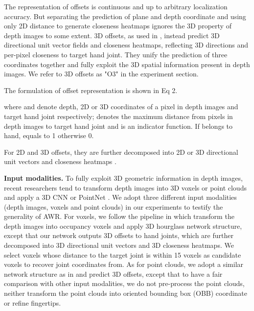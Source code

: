 \documentclass[letterpaper]{article} \usepackage{aaai20}  \usepackage{times}  \usepackage{helvet} \usepackage{courier}  \usepackage[hyphens]{url}  \usepackage{graphicx} \usepackage{amsmath}
\begin{document}
The representation of offsets is continuous and up to arbitrary localization accuracy. But separating the prediction of plane and depth coordinate and using only 2D distance to generate closeness heatmaps ignores the 3D property of depth images to some extent. 3D offsets, as used in \cite{srn,dense3d}, instead predict 3D directional unit vector fields and closeness heatmaps, reflecting 3D directions and per-pixel closeness to target hand joint. They unify the prediction of three coordinates together and fully exploit the 3D spatial information present in depth images. We refer to 3D offsets as "O3" in the experiment section.

\parskip=0pt

The formulation of offset representation  is shown in Eq 2. 

\begin{small}

\end{small}

\parskip=0pt

\noindent where  and  denote depth, 2D or 3D coordinates of a pixel in depth images and target hand joint respectively;  denotes the maximum distance from pixels in depth images to target hand joint and  is an indicator function. If  belongs to hand,  equals to 1 otherwise 0.

\parskip=0pt

For 2D and 3D offsets, they are further decomposed into 2D or 3D directional unit vectors  and closeness heatmaps .  

\begin{small}

\end{small}

\parskip=0pt

\textbf{Input modalities.} To fully exploit 3D geometric information in depth images, recent researchers tend to transform depth images into 3D voxels \cite{v2v} or point clouds \cite{handpointnet,p2p} and apply a 3D CNN or PointNet \cite{pointnet}. We adopt three different input modalities (depth images, voxels and point clouds) in our experiments to testify the generality of AWR. For voxels, we follow the pipeline in \cite{v2v} which transform the depth images into occupancy voxels and apply 3D hourglass network structure, except that our network outputs 3D offsets to hand joints, which are further decomposed into 3D directional unit vectors and 3D closeness heatmaps. We select voxels whose distance to the target joint is within 15 voxels as candidate voxels to recover joint coordinates from. As for point clouds, we adopt a similar network structure as in \cite{p2p} and predict 3D offsets, except that to have a fair comparison with other input modalities, we do not pre-process the point clouds, neither transform the point clouds into oriented bounding box (OBB) coordinate or refine fingertips. 
\end{document}
